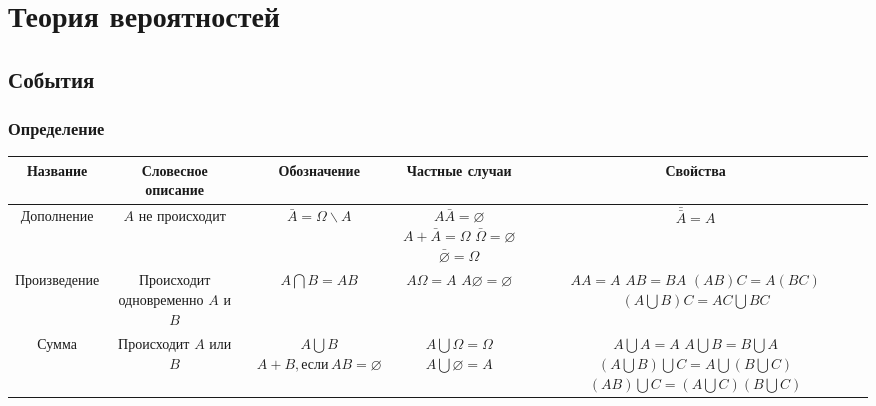 \section{Теория вероятностей}

\subsection{События}

\subsubsection{Определение}

\begin{tabu}[t]{||c|c|c|c|c||}
	\hline
		Название & Словесное описание & Обозначение & Частные случаи & Свойства \\
	\hline
		Дополнение &
		$A$ не происходит &
		$\displaystyle \bar{A} = \Omega \backslash A $ &
		 &
		$\displaystyle \bar{\bar{A}} = A $ \\
	\hline
		Произведение &
		Происходит одновременно $A$ и $B$ &
		$\displaystyle A\bigcap B = AB $ &
		 &
		 \\
	\hline
		Сумма &
		Происходит $A$ или $B$ &
		 &
		 &
		 \\

\end{tabu}
